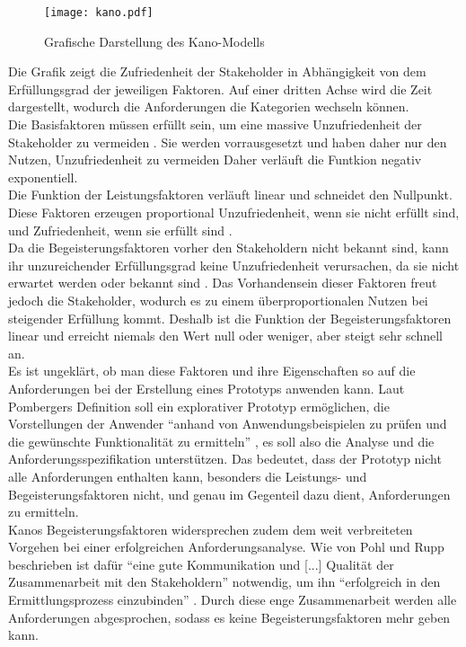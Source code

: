 \documentclass [12pt, a4paper, oneside, titlepage, ngerman]{article}
\begin{document}
\begin{figure}[H]
	\centering
	\texttt{[image: kano.pdf]}
	\caption{Grafische Darstellung des Kano-Modells}
	\label{img:kano}
\end{figure}
\noindent Die Grafik zeigt die Zufriedenheit der Stakeholder in Abhängigkeit von dem Erfüllungsgrad der jeweiligen Faktoren. Auf einer dritten Achse wird die Zeit dargestellt, wodurch die Anforderungen die Kategorien wechseln können. \\
Die Basisfaktoren müssen erfüllt sein, um eine massive Unzufriedenheit der Stakeholder zu vermeiden \cite[vgl. S.106]{Kano}. Sie werden vorrausgesetzt und haben daher nur den Nutzen, Unzufriedenheit zu vermeiden Daher verläuft die Funtkion negativ exponentiell. \\
Die Funktion der Leistungsfaktoren verläuft linear und schneidet den Nullpunkt. Diese Faktoren erzeugen proportional Unzufriedenheit, wenn sie nicht erfüllt sind, und Zufriedenheit, wenn sie erfüllt sind \cite[vgl. S.106]{Kano}. \\
Da die Begeisterungsfaktoren vorher den Stakeholdern nicht bekannt sind, kann ihr unzureichender Erfüllungsgrad keine Unzufriedenheit verursachen, da sie nicht erwartet werden oder bekannt sind \cite[vgl. S.106]{Kano}. Das Vorhandensein dieser Faktoren freut jedoch die Stakeholder, wodurch es zu einem überproportionalen Nutzen bei steigender Erfüllung kommt. Deshalb ist die Funktion der Begeisterungsfaktoren linear und erreicht niemals den Wert null oder weniger, aber steigt sehr schnell an. \\

\noindent Es ist ungeklärt, ob man diese Faktoren und ihre Eigenschaften so auf die Anforderungen bei der Erstellung eines Prototyps anwenden kann. Laut Pombergers Definition soll ein explorativer Prototyp ermöglichen, die Vorstellungen der Anwender "`anhand von Anwendungsbeispielen zu prüfen und die gewünschte Funktionalität zu ermitteln"' \cite[S.27]{pomberger2004}, es soll also die Analyse und die Anforderungsspezifikation unterstützen. Das bedeutet, dass der Prototyp nicht alle Anforderungen enthalten kann, besonders die Leistungs- und Begeisterungsfaktoren nicht, und genau im Gegenteil dazu dient, Anforderungen zu ermitteln. \\
Kanos Begeisterungsfaktoren widersprechen zudem dem weit verbreiteten Vorgehen bei einer erfolgreichen Anforderungsanalyse. Wie von Pohl und Rupp beschrieben ist dafür "`eine gute Kommunikation und [...] Qualität der Zusammenarbeit mit den Stakeholdern"' \cite[S.33]{PohlRupp2015} notwendig, um ihn "`erfolgreich in den Ermittlungsprozess einzubinden"' \cite[S.34]{PohlRupp2015}. Durch diese enge Zusammenarbeit werden alle Anforderungen abgesprochen, sodass es keine Begeisterungsfaktoren mehr geben kann.
\end{document}
